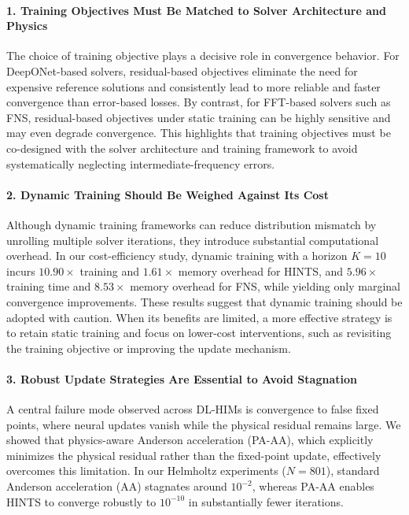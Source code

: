 \documentclass[11pt]{article}
\begin{document}
\paragraph{1. Training Objectives Must Be Matched to Solver Architecture and Physics} The choice of training objective plays a decisive role in convergence behavior. For DeepONet-based solvers, residual-based objectives eliminate the need for expensive reference solutions and consistently lead to more reliable and faster convergence than error-based losses. By contrast, for FFT-based solvers such as FNS, residual-based objectives under static training can be highly sensitive and may even degrade convergence. This highlights that training objectives must be co-designed with the solver architecture and training framework to avoid systematically neglecting intermediate-frequency errors.

\paragraph{2. Dynamic Training Should Be Weighed Against Its Cost}
Although dynamic training frameworks can reduce distribution mismatch by unrolling multiple solver iterations, they introduce substantial computational overhead. In our cost-efficiency study, dynamic training with a horizon $K=10$ incurs $10.90\times$ training and $1.61\times$ memory overhead for HINTS, and $5.96\times$ training time and $8.53\times$ memory overhead for FNS, while yielding only marginal convergence improvements. These results suggest that dynamic training should be adopted with caution. When its benefits are limited, a more effective strategy is to retain static training and focus on lower-cost interventions, such as revisiting the training objective or improving the update mechanism.

\paragraph{3. Robust Update Strategies Are Essential to Avoid Stagnation}
A central failure mode observed across DL-HIMs is convergence to false fixed points, where neural updates vanish while the physical residual remains large. We showed that physics-aware Anderson acceleration (PA-AA), which explicitly minimizes the physical residual rather than the fixed-point update, effectively overcomes this limitation. In our Helmholtz experiments ($N=801$), standard Anderson acceleration (AA) stagnates around $10^{-2}$, whereas PA-AA enables HINTS to converge robustly to $10^{-10}$ in substantially fewer iterations.
\end{document}
